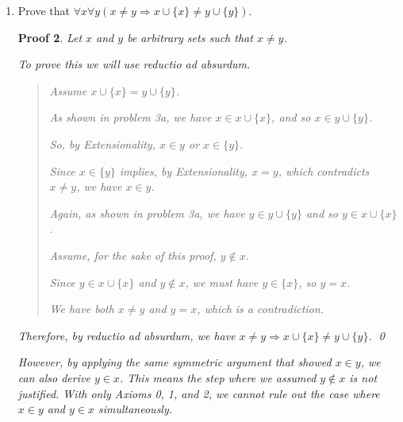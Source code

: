 \documentclass[12pt]{article}
\theoremstyle{proofstyle}
\newtheorem*{proof*}{Proof}
\begin{document}
\begin{enumerate}[left=0pt, itemsep=2em, parsep=1em]
\begin{enumerate}[label=(\alph*), itemsep=1.5em, leftmargin=2em]
\begin{proof*}
    By Pairing applied to $x$ and $x$, there exists a set $\{x, x\}$.
    
    By Extensionality, $\{x, x\} = \{x\}$.
    
    Since $\{x\} \subseteq x \cup \{x\}$ by Problem 1c, and $x \in \{x\}$, we have $x \in x \cup \{x\}$ by the definition of subset.    \
    
    Suppose for contradiction that $x \cup \{x\} = \emptyset$. By Extensionality, $x \cup \{x\}$ and $\emptyset$ have the same elements. But $x \in x \cup \{x\}$ and $x \notin \emptyset$, a contradiction.
    
    Therefore, $x \cup \{x\} \neq \emptyset$. \qed
\end{proof*}

\item Prove that $\forall x\forall y(x \neq y \Rightarrow x \cup \{x\} \neq y \cup \{y\})$.

\begin{proof*}
    Let $x$ and $y$ be arbitrary sets such that $x \neq y$.
    
    To prove this we will use reductio ad absurdum. 
    \begin{quote}
        Assume $x \cup \{x\} = y \cup \{y\}$.
        
        As shown in problem 3a, we have $x \in x \cup \{x\}$, and so $x \in y \cup \{y\}$.
        
        So, by Extensionality, $x \in y$ or $x \in \{y\}$. 
        
        Since $x \in \{y\}$ implies, by Extensionality, $x = y$, which contradicts $x \neq y$, we have $x \in y$.
        
        Again, as shown in problem 3a, we have $y \in y \cup \{y\}$ and so $y \in x \cup \{x\}$.

        Assume, for the sake of this proof, $y \notin x$.
                
        Since $y \in x \cup \{x\}$ and $y \notin x$, we must have $y \in \{x\}$, so $y = x$. 
        
        We have both $x \neq y$ and $y = x$, which is a contradiction.
    \end{quote}
        
    Therefore, by reductio ad absurdum, we have $x \neq y \Rightarrow x \cup \{x\} \neq y \cup \{y\}$. \qed
        
    However, by applying the same symmetric argument that showed $x \in y$, we can also derive $y \in x$. This means the step where we assumed 
    $y \notin x$ is not justified. With only Axioms 0, 1, and 2, we cannot rule out the case where $x \in y$ and $y \in x$ simultaneously.
\end{proof*}
\end{enumerate}

\end{enumerate}
\end{document}
